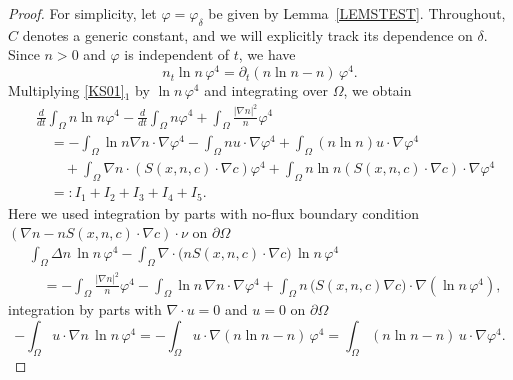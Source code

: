 \documentclass{amsart}
\numberwithin{equation}{section}
\begin{document}
\begin{proof}
For simplicity, let $\varphi=\varphi_\delta$ be given by Lemma~\ref{LEMSTEST}.
Throughout, $C$ denotes a generic constant, and we will explicitly track its dependence on $\delta$. Since $n>0$ and $\varphi$ is independent of $t$, we have
\[
n_t \ln n\,\varphi^4 = \partial_t(n\ln n-n)\,\varphi^4.
\]
Multiplying \eqref{KS01}$_1$ by $\ln n\,\varphi^{4}$ and integrating over $\Omega$, we obtain  
\begin{equation}\label{MAR66}
\begin{aligned}
 &\frac{d}{dt}\int_{\Omega}  n\ln n \varphi^{4}- \frac{d}{dt}\int_{\Omega}n\varphi^{4} + \int_{\Omega} \frac{|\nabla n|^{2}}{n}\varphi^{4} \\
&\quad  = -\int_{\Omega} \ln n\nabla n\cdot \nabla \varphi^{4}  -\int_{\Omega} n u \cdot \nabla \varphi^4 + \int_{\Omega} \left( n \ln n \right)u \cdot \nabla \varphi^4 \\
&\qquad + \int_{\Omega}\nabla n  \cdot ( S(x,n,c)\cdot\nabla c) \varphi^{4}
  + \int_{\Omega}n\ln n (S(x,n,c)\cdot\nabla c  ) \cdot\nabla \varphi^4  \\
&\quad  =: I_1 + I_2 + I_3 + I_4 + I_5.
\end{aligned}
\end{equation}
Here we used integration by parts with no-flux boundary condition $\left(\nabla n - n S(x,n,c) \cdot \nabla c\right)\cdot \nu$ on $\partial \Omega$
\[\begin{aligned}
&\int_{\Omega}\Delta n \,\ln n\,\varphi^{4} -\int_{\Omega}\nabla\cdot\bigl(nS(x,n,c) \cdot \nabla c\bigr)\,\ln n\,\varphi^{4} \\
&\quad =-\int_{\Omega}\frac{|\nabla n|^{2}}{n}\varphi^{4}
-\int_{\Omega}\ln n\,\nabla n\cdot\nabla\varphi^{4}
+\int_{\Omega} n\,\bigl(S(x,n,c)\nabla c\bigr)\cdot\nabla(\ln n\,\varphi^{4}),
\end{aligned}\]
integration by parts with $\nabla \cdot u =0 $ and $u=0$ on $\partial \Omega$
\[
-\int_{\Omega} u\cdot\nabla n\,\ln n\,\varphi^{4}
= -\int_{\Omega} u\cdot\nabla(n\ln n-n)\,\varphi^{4}
= \int_{\Omega}(n\ln n-n)\,u\cdot\nabla\varphi^{4}.
\]

\smallskip


\end{proof}
\end{document}
